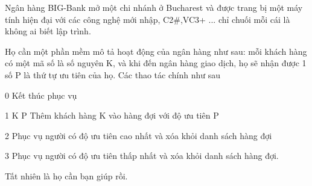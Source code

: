 Ngân hàng  BIG-Bank mở một chi nhánh ở Bucharest và được trang bị một máy tính hiện đại với các công nghệ mới nhập, C2\#,VC3+ ... chỉ chuối mỗi cái là không ai biết lập trình.  

   Họ cần một phần mềm mô tả hoạt động của ngân hàng như sau: mỗi khách hàng có một mã số là số nguyên K, và khi đến ngân hàng giao dịch, họ sẽ nhận được 1 số P là thứ tự ưu tiên của họ. Các thao tác chính như sau  

   0  Kết thúc phục vụ  

   1  K P Thêm khách hàng K vào hàng đợi với độ ưu tiên P  

   2  Phục vụ người có độ ưu tiên cao nhất và xóa khỏi danh sách hàng đợi  

   3  Phục vụ người có độ ưu tiên thấp nhất và xóa khỏi danh sách hàng đợi.  

   Tất nhiên là họ cần bạn giúp rồi.
